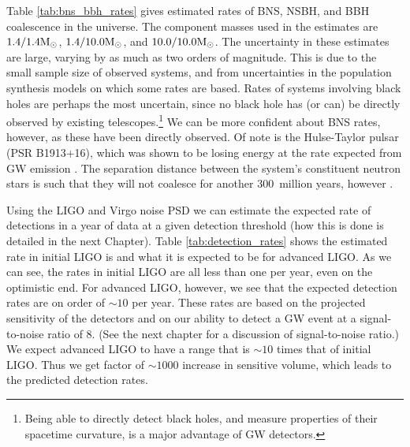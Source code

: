Table \ref{tab:bns_bbh_rates} gives estimated rates of \ac{BNS}, \ac{NSBH}, and \ac{BBH} coalescence in the universe. The component masses used in the estimates are $1.4/1.4\mathrm{M_\odot}$, $1.4/10.0\mathrm{M_\odot}$, and $10.0/10.0\mathrm{M_\odot}$. The uncertainty in these estimates are large, varying by as much as two orders of magnitude. This is due to the small sample size of observed systems, and from uncertainties in the population synthesis models on which some rates are based. Rates of systems involving black holes are perhaps the most uncertain, since no black hole has (or can) be directly observed by existing telescopes.\footnote{Being able to directly detect black holes, and measure properties of their spacetime curvature, is a major advantage of \ac{GW} detectors.} We can be more confident about \ac{BNS} rates, however, as these have been directly observed. Of note is the Hulse-Taylor pulsar (PSR B1913+16), which was shown to be losing energy at the rate expected from \ac{GW} emission \cite{Hulse1975Discovery, Taylor:1982}. The separation distance between the system's constituent neutron stars is such that they will not coalesce for another $300\,$ million years, however \cite{Brown}.

Using the \ac{LIGO} and Virgo noise \ac{PSD} we can estimate the expected rate of detections in a year of data at a given detection threshold (how this is done is detailed in the next Chapter). Table \ref{tab:detection_rates} shows the estimated rate in initial \ac{LIGO} is and what it is expected to be for advanced \ac{LIGO}. As we can see, the rates in initial \ac{LIGO} are all less than one per year, even on the optimistic end. For advanced \ac{LIGO}, however, we see that the expected detection rates are on order of $\sim 10$ per year. These rates are based on the projected sensitivity of the detectors and on our ability to detect a \ac{GW} event at a signal-to-noise ratio of 8. (See the next chapter for a discussion of signal-to-noise ratio.) We expect advanced \ac{LIGO} to have a range that is $\sim10$ times that of initial \ac{LIGO}. Thus we get factor of $\sim1000$ increase in sensitive volume, which leads to the predicted detection rates.

